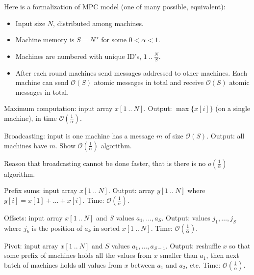 \documentclass[12pt]{uebung}
\begin{document}
 
\newcommand{\bigo}{\mathcal{O}}
\renewcommand{\aufgname}{Exercise}


Here is a formalization of MPC model (one of many possible, equivalent):

\begin{itemize}
\item Input size $N$, distributed among machines.
\item Machine memory is $S = N^{\alpha}$ for some $0 < \alpha < 1$.
\item Machines are numbered with unique ID's, $1\ ..\ \frac{N}{S}$.
\item After each round machines send messages addressed to other machines. Each machine can send $\bigo(S)$ atomic messages  in total and receive $\bigo(S)$ atomic messages in total.
\end{itemize}

\begin{aufg}
Maximum computation: input array $x[1\ ..\ N]$. Output: $\max\{x[i]\}$ (on a single machine), in time $\bigo(\frac{1}{\alpha})$.
\end{aufg}

\begin{aufg}
Broadcasting: input is one machine has a message $m$ of size $\bigo(S)$. Output: all machines have $m$. Show $\bigo(\frac{1}{\alpha})$ algorithm.
\end{aufg}

\begin{aufg}
Reason that broadcasting cannot be done faster, that is there is no $o(\frac{1}{\alpha})$ algorithm.
\end{aufg}

\begin{aufg}
Prefix sums:  input array $x[1\ ..\ N]$. Output: array $y[1\ ..\ N]$ where $y[i] = x[1]+\ldots+x[i]$. Time: $\bigo(\frac{1}{\alpha})$.
\end{aufg}

\begin{aufg}
Offsets: input array $x[1\ ..\ N]$ and $S$ values $a_1,\ldots,a_S$. Output: values $j_1,\ldots,j_S$ where $j_k$ is the position of $a_k$ in sorted $x[1\ ..\ N]$. Time: $\bigo(\frac{1}{\alpha})$.
\end{aufg}

\begin{aufg}
Pivot: input array $x[1\ ..\ N]$ and $S$ values $a_1,\ldots,a_{S-1}$. Output: reshuffle $x$ so that some prefix of machines holds all the values from $x$ smaller than $a_1$, then next batch of machines holds all values from $x$ between $a_1$ and $a_2$, etc. Time: $\bigo(\frac{1}{\alpha})$.
\end{aufg}
\end{document}
